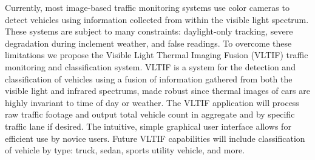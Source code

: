 \-Currently, most image-\/based traffic monitoring systems use color cameras to detect vehicles using information collected from within the visible light spectrum. \-These systems are subject to many constraints\-: daylight-\/only tracking, severe degradation during inclement weather, and false readings. \-To overcome these limitations we propose the \-Visible \-Light \-Thermal \-Imaging \-Fusion (\-V\-L\-T\-I\-F) traffic monitoring and classification system. \-V\-L\-T\-I\-F is a system for the detection and classification of vehicles using a fusion of information gathered from both the visible light and infrared spectrums, made robust since thermal images of cars are highly invariant to time of day or weather. \-The \-V\-L\-T\-I\-F application will process raw traffic footage and output total vehicle count in aggregate and by specific traffic lane if desired. \-The intuitive, simple graphical user interface allows for efficient use by novice users. \-Future \-V\-L\-T\-I\-F capabilities will include classification of vehicle by type\-: truck, sedan, sports utility vehicle, and more.

